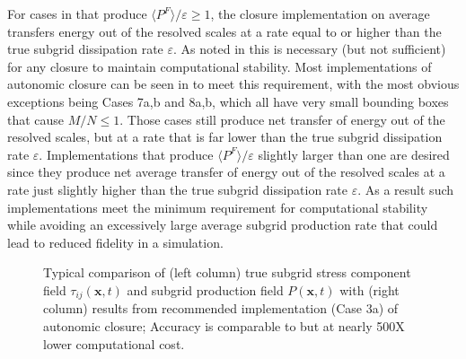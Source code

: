 For cases in  that produce $\langle P^F \rangle/\varepsilon \geq 1$, the closure implementation on average transfers energy out of the resolved scales at a rate equal to or higher than the true subgrid dissipation rate $\varepsilon$. As noted in  this is necessary (but not sufficient) for any closure to maintain computational stability.  Most implementations of autonomic closure can be seen in  to meet this requirement, with the most obvious exceptions being Cases 7a,b and 8a,b, which all have very small bounding boxes that cause $M/N \leq 1$. Those cases still produce net transfer of energy out of the resolved scales, but at a rate that is far lower than the true subgrid dissipation rate $\varepsilon$. Implementations that produce  $\langle P^F \rangle/\varepsilon$  slightly larger than one are desired since they produce net average transfer of energy out of the resolved scales at a rate just slightly higher than the true subgrid dissipation rate $\varepsilon$. As a result such implementations meet the minimum requirement for computational stability while avoiding an excessively large average subgrid production rate that could lead to reduced fidelity in a simulation. 



%
\begin{figure}
	\centering %
	\label{F:10a}
\end{figure}
%
\begin{figure}
	\ContinuedFloat
	\centering %
	\label{F:10b}
\end{figure}
%
\begin{figure}
	\ContinuedFloat
	\centering %
	\label{F:10c}
\end{figure}
%
\begin{figure}
	\ContinuedFloat
	\caption{Typical comparison of (left column) true subgrid stress component field $\tau_{ij}(\mathbf{x},t)$ and subgrid production field $P(\mathbf{x},t)$ with (right column) results from recommended implementation (Case 3a) of autonomic closure; Accuracy is comparable to  but at nearly 500X lower computational cost.}
	\label{F:10}
\end{figure}
%
%

